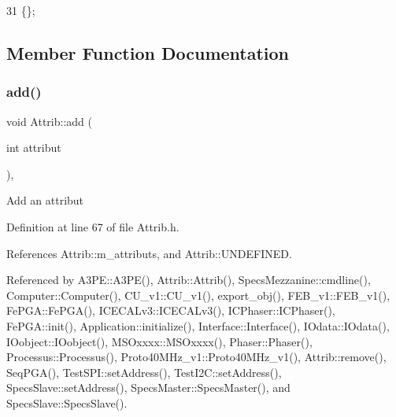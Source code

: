 \begin{DoxyCode}
31 \{\}; 
\end{DoxyCode}


\subsection{Member Function Documentation}
\mbox{\label{classAttrib_a235f773af19c900264a190b00a3b4ad7}} 
\subsubsection{\texorpdfstring{add()}{add()}}
{\footnotesize\ttfamily void Attrib\+::add (\begin{DoxyParamCaption}\item[{int}]{attribut }\end{DoxyParamCaption})\hspace{0.3cm}{\ttfamily [inline]}, {\ttfamily [inherited]}}

Add an attribut 

Definition at line 67 of file Attrib.\+h.



References Attrib\+::m\+\_\+attributs, and Attrib\+::\+U\+N\+D\+E\+F\+I\+N\+ED.



Referenced by A3\+P\+E\+::\+A3\+P\+E(), Attrib\+::\+Attrib(), Specs\+Mezzanine\+::cmdline(), Computer\+::\+Computer(), C\+U\+\_\+v1\+::\+C\+U\+\_\+v1(), export\+\_\+obj(), F\+E\+B\+\_\+v1\+::\+F\+E\+B\+\_\+v1(), Fe\+P\+G\+A\+::\+Fe\+P\+G\+A(), I\+C\+E\+C\+A\+Lv3\+::\+I\+C\+E\+C\+A\+Lv3(), I\+C\+Phaser\+::\+I\+C\+Phaser(), Fe\+P\+G\+A\+::init(), Application\+::initialize(), Interface\+::\+Interface(), I\+Odata\+::\+I\+Odata(), I\+Oobject\+::\+I\+Oobject(), M\+S\+Oxxxx\+::\+M\+S\+Oxxxx(), Phaser\+::\+Phaser(), Processus\+::\+Processus(), Proto40\+M\+Hz\+\_\+v1\+::\+Proto40\+M\+Hz\+\_\+v1(), Attrib\+::remove(), Seq\+P\+G\+A(), Test\+S\+P\+I\+::set\+Address(), Test\+I2\+C\+::set\+Address(), Specs\+Slave\+::set\+Address(), Specs\+Master\+::\+Specs\+Master(), and Specs\+Slave\+::\+Specs\+Slave().


